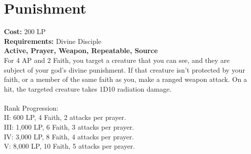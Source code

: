 \section{Punishment}\label{prayer:punishment}
\textbf{Cost:} 200 LP\\
\textbf{Requirements:} Divine Disciple \\
\textbf{Active, Prayer, Weapon, Repeatable, Source}\\
For 4 AP and 2 Faith, you target a creature that you can see, and they are subject of your god's divine punishment.
If that creature isn't protected by your faith, or a member of the same faith as you, make a ranged weapon attack.
On a hit, the targeted creature takes 1D10 radiation damage.\\
\\
Rank Progression:\\
II: 600 LP, 4 Faith, 2 attacks per prayer.\\
III: 1,000 LP, 6 Faith, 3 attacks per prayer.\\
IV: 3,000 LP, 8 Faith, 4 attacks per prayer.\\
V: 8,000 LP, 10 Faith, 5 attacks per prayer.\\